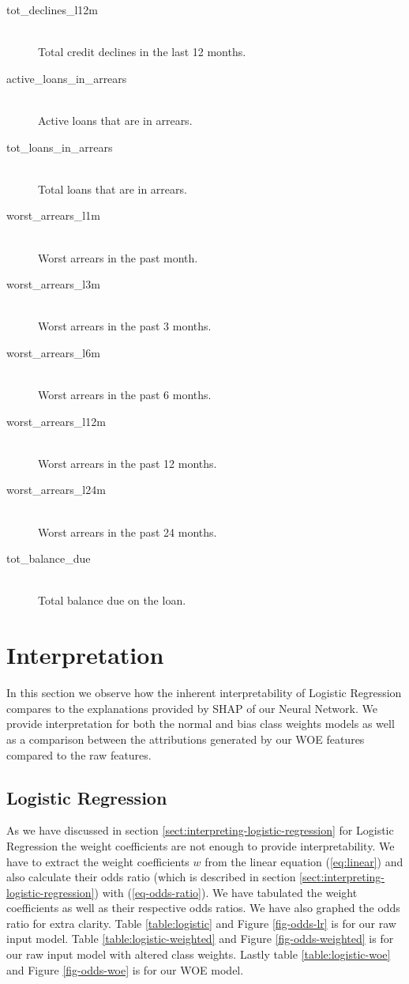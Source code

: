 \begin{description}
     \item[tot\_declines\_l12m] \hfill \\ Total credit declines in the last 12 months.
     \item[active\_loans\_in\_arrears] \hfill \\ Active loans that are in arrears.
     \item[tot\_loans\_in\_arrears] \hfill \\ Total loans that are in arrears.
     \item[worst\_arrears\_l1m] \hfill \\ Worst arrears in the past month.
     \item[worst\_arrears\_l3m] \hfill \\ Worst arrears in the past 3 months.
     \item[worst\_arrears\_l6m] \hfill \\ Worst arrears in the past 6 months.
     \item[worst\_arrears\_l12m] \hfill \\ Worst arrears in the past 12 months.
     \item[worst\_arrears\_l24m] \hfill \\ Worst arrears in the past 24 months.
     \item[tot\_balance\_due] \hfill \\ Total balance due on the loan.
 \end{description}
\section{Interpretation} \label{sec-interpretation}
In this section we observe how the inherent interpretability of Logistic Regression compares to the explanations provided by SHAP of our Neural Network. We provide interpretation for both the normal and bias class weights models as well as a comparison between the attributions generated by our WOE features compared to the raw features.
\subsection{Logistic Regression}
As we have discussed in section \ref{sect:interpreting-logistic-regression} for Logistic Regression the weight coefficients are not enough to provide interpretability.  We have to extract the weight coefficients $w$ from the linear equation (\ref{eq:linear}) and also calculate their odds ratio (which is described in section \ref{sect:interpreting-logistic-regression}) with (\ref{eq-odds-ratio}). We have tabulated the weight coefficients as well as their respective odds ratios. We have also graphed the odds ratio for extra clarity. Table \ref{table:logistic} and Figure \ref{fig-odds-lr}  is for our raw input model. Table \ref{table:logistic-weighted} and Figure \ref{fig-odds-weighted} is for our raw input model with altered class weights. Lastly table \ref{table:logistic-woe} and Figure \ref{fig-odds-woe} is for our WOE model.


